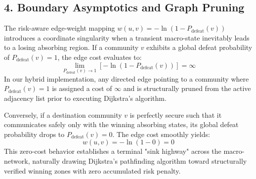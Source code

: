 \documentclass[9pt,twocolumn,twoside]{pnas-report}
\begin{document}
\subsection*{4. Boundary Asymptotics and Graph Pruning}
The risk-aware edge-weight mapping $w(u,v) = -\ln(1 - P_{\text{defeat}}(v))$ introduces a coordinate singularity when a transient macro-state inevitably leads to a losing absorbing region. If a community $v$ exhibits a global defeat probability of $P_{\text{defeat}}(v) = 1$, the edge cost evaluates to:
\begin{equation}
\lim_{P_{\text{defeat}}(v) \to 1} \left[-\ln\left(1 - P_{\text{defeat}}(v)\right)\right] = \infty
\end{equation}
In our hybrid implementation, any directed edge pointing to a community where $P_{\text{defeat}}(v) = 1$ is assigned a cost of $\infty$ and is structurally pruned from the active adjacency list prior to executing Dijkstra's algorithm.

Conversely, if a destination community $v$ is perfectly secure such that it communicates safely only with the winning absorbing states, its global defeat probability drops to $P_{\text{defeat}}(v) = 0$. The edge cost smoothly yields:
\begin{equation}
w(u,v) = -\ln(1 - 0) = 0
\end{equation}
This zero-cost behavior establishes a terminal "sink highway" across the macro-network, naturally drawing Dijkstra's pathfinding algorithm toward structurally verified winning zones with zero accumulated risk penalty.
\end{document}
